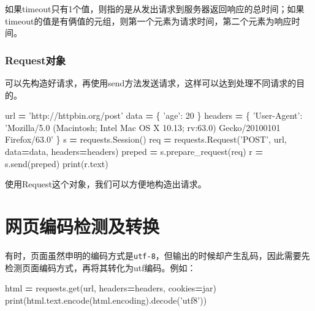 \documentclass[]{ctexbook}
\newenvironment{Shaded}{\begin{snugshade}}{\end{snugshade}}
\newcommand{\BuiltInTok}[1]{#1}
\newcommand{\DecValTok}[1]{\textcolor[rgb]{0.00,0.00,0.81}{#1}}
\newcommand{\NormalTok}[1]{#1}
\newcommand{\OperatorTok}[1]{\textcolor[rgb]{0.81,0.36,0.00}{\textbf{#1}}}
\newcommand{\StringTok}[1]{\textcolor[rgb]{0.31,0.60,0.02}{#1}}
\begin{document}
如果timeout只有1个值，则指的是从发出请求到服务器返回响应的总时间；如果timeout的值是有俩值的元组，则第一个元素为请求时间，第二个元素为响应时间。

\hypertarget{requestux5bf9ux8c61}{%
\subsubsection{Request对象}\label{requestux5bf9ux8c61}}

可以先构造好请求，再使用send方法发送请求，这样可以达到处理不同请求的目的。

\begin{Shaded}
\begin{Highlighting}[]
\NormalTok{url }\OperatorTok{=} \StringTok{'http://httpbin.org/post'}
\NormalTok{data }\OperatorTok{=}\NormalTok{ \{}
    \StringTok{'age'}\NormalTok{: }\DecValTok{20}
\NormalTok{\}}
\NormalTok{headers }\OperatorTok{=}\NormalTok{ \{}
    \StringTok{'User-Agent'}\NormalTok{: }\StringTok{'Mozilla/5.0 (Macintosh; Intel Mac OS X 10.13; rv:63.0) Gecko/20100101 Firefox/63.0'}
\NormalTok{\}}
\NormalTok{s }\OperatorTok{=}\NormalTok{ requests.Session()}
\NormalTok{req }\OperatorTok{=}\NormalTok{ requests.Request(}\StringTok{'POST'}\NormalTok{, url, data}\OperatorTok{=}\NormalTok{data, headers}\OperatorTok{=}\NormalTok{headers)}
\NormalTok{preped }\OperatorTok{=}\NormalTok{ s.prepare_request(req)}
\NormalTok{r }\OperatorTok{=}\NormalTok{ s.send(preped)}
\BuiltInTok{print}\NormalTok{(r.text)}
\end{Highlighting}
\end{Shaded}

使用Request这个对象，我们可以方便地构造出请求。

\hypertarget{ux7f51ux9875ux7f16ux7801ux68c0ux6d4bux53caux8f6cux6362}{%
\section{网页编码检测及转换}\label{ux7f51ux9875ux7f16ux7801ux68c0ux6d4bux53caux8f6cux6362}}

有时，页面虽然申明的编码方式是\texttt{utf-8}，但输出的时候却产生乱码，因此需要先检测页面编码方式，再将其转化为utf编码。例如：

\begin{Shaded}
\begin{Highlighting}[]
\NormalTok{html }\OperatorTok{=}\NormalTok{ requests.get(url, headers}\OperatorTok{=}\NormalTok{headers, cookies}\OperatorTok{=}\NormalTok{jar)}
\BuiltInTok{print}\NormalTok{(html.text.encode(html.encoding).decode(}\StringTok{'utf8'}\NormalTok{))}
\end{Highlighting}
\end{Shaded}
\end{document}
